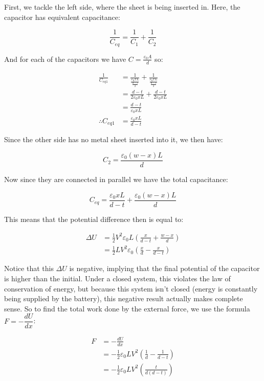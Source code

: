 \documentclass{article}
\theoremstyle{definition}
\numberwithin{equation}{section}
\numberwithin{definition}{section}
\begin{document}
    First, we tackle the left side, where the sheet is being inserted in. Here, the capacitor has equivalent capacitance:

    \[ \frac{1}{C_{eq}} = \frac{1}{C_1} + \frac{1}{C_2} \]

    And for each of the capacitors we have $C = \frac{\varepsilon_0 A}{d}$ so:

    \begin{align*}
        \frac{1}{C_{eq1}} &= \frac{1}{\frac{\varepsilon_0 x L}{\frac{d-t}{2}}} + \frac{1}{\frac{\varepsilon_0 x L}{\frac{d-t}{2}}}\\
        &= \frac{d-t}{2\varepsilon_0 xL} + \frac{d-t}{2\varepsilon_0 xL}\\
        &= \frac{d-t}{\varepsilon_0 xL}\\
        \therefore C_{eq1} &= \frac{\varepsilon_0 xL}{d-t}
    \end{align*}

    Since the other side has no metal sheet inserted into it, we then have:

    \[ C_2 = \frac{\varepsilon_0 (w-x)L}{d}\]

    Now since they are connected in parallel we have the total capacitance: 

    \[ C_{eq} = \frac{\varepsilon_0 xL}{d-t} + \frac{\varepsilon_0 (w-x) L}{d}\]

    This means that the potential difference then is equal to:

    \begin{align*}
        \Delta U &= \frac{1}{2} V^2 \varepsilon_0 L\left(\frac{x}{d-t} + \frac{w-x}{d}\right) \\
        &= \frac{1}{2} L V^2 \varepsilon_0\left(\frac{x}{d} - \frac{x}{d-t}\right)
    \end{align*}

    Notice that this $\Delta U$ is negative, implying that the final potential of the capacitor is higher than the initial. Under a closed system, this violates the law of conservation of energy, but because this system isn't closed (energy is constantly being supplied by the battery), this negative result actually makes complete sense. So to find the total work done by the external force, we use the formula $F = -\dfrac{dU}{dx}$:
    
    
    \begin{align*}
        F  &= -\frac{dU}{dx}\\
        &= -\frac{1}{2}\varepsilon_0 LV^2\left(\frac{1}{d} - \frac{1}{d-t}\right)\\
        &= -\frac{1}{2}\varepsilon_0 LV^2\left(\frac{t}{d(d-t)}\right) 
    \end{align*}
\end{document}
